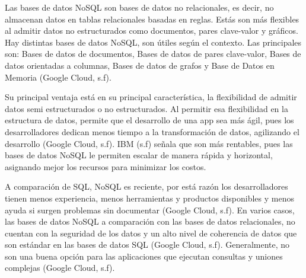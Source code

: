 Las bases de datos NoSQL son bases de datos no relacionales, es decir, no almacenan datos en tablas relacionales basadas en reglas. Estás son más flexibles al admitir datos no estructurados como documentos, pares clave-valor y gráficos. Hay distintas bases de datos NoSQL, son útiles según el contexto. Las principales son: Bases de datos de documentos, Bases de datos de pares clave-valor, Bases de datos orientadas a columnas, Bases de datos de grafos y Base de Datos en Memoria (Google Cloud, s.f). 

Su principal ventaja está en su principal característica, la flexibilidad de admitir datos semi estructurados o no estructurados. Al permitir esa flexibilidad en la estructura de datos, permite que el desarrollo de una app sea más ágil, pues los desarrolladores dedican menos tiempo a la transformación de datos, agilizando el desarrollo (Google Cloud, s.f).
IBM (s.f) señala que son más rentables, pues las bases de datos NoSQL le permiten escalar de manera rápida y horizontal, asignando mejor los recursos para minimizar los costos.

A comparación de SQL, NoSQL es reciente, por está razón los desarrolladores tienen menos experiencia, menos herramientas y productos disponibles y menos ayuda si surgen problemas sin documentar (Google Cloud, s.f). 
En varios casos, las bases de datos NoSQL a comparación con las bases de datos relacionales, no cuentan con la seguridad de los datos y un alto nivel de coherencia de datos que son estándar en las bases de datos SQL (Google Cloud, s.f). 
Generalmente, no son una buena opción para las aplicaciones que ejecutan consultas y uniones complejas (Google Cloud, s.f).
